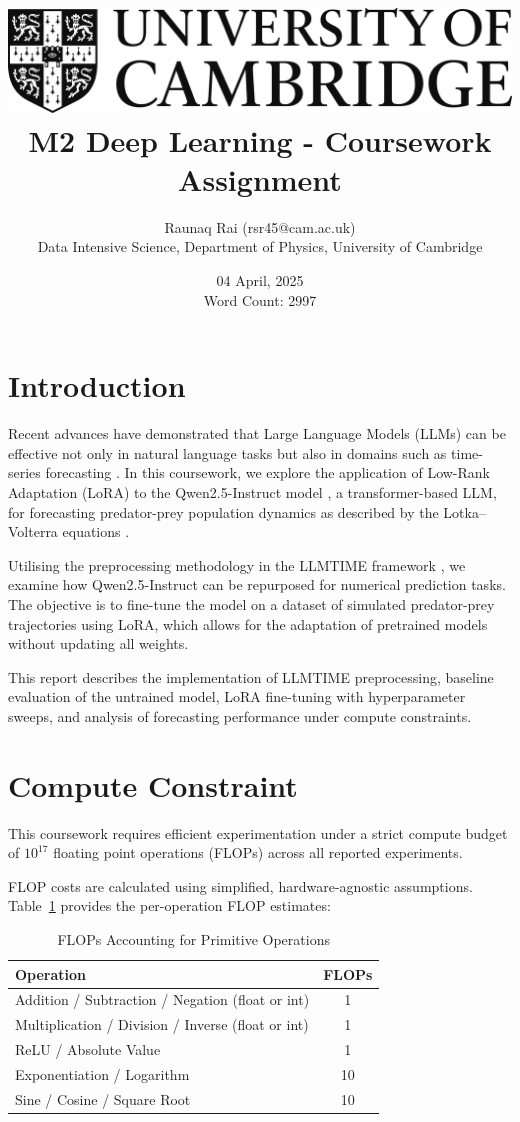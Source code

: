 \documentclass[a4paper,12pt]{article}
\title{
    \includegraphics[scale=0.4]{Cam_logo_bw.png}\\
    \vspace{0.5cm}
    M2 Deep Learning - Coursework Assignment
}
\author{Raunaq Rai (rsr45@cam.ac.uk)\\
    Data Intensive Science, Department of Physics, University of Cambridge
}
\date{04 April, 2025 \\ \vspace{0.2cm} {\small Word Count: 2997}}
\begin{document}
\maketitle

\section*{Introduction}

Recent advances have demonstrated that Large Language Models (LLMs) can be effective not only in natural language tasks but also in domains such as time-series forecasting \citep{gruver2023language}. In this coursework, we explore the application of Low-Rank Adaptation (LoRA) \citep{hu2021lora} to the Qwen2.5-Instruct model \citep{qwen2.5}, a transformer-based LLM, for forecasting predator-prey population dynamics as described by the Lotka–Volterra equations \citep{takeuchi2006lotka}.

Utilising the preprocessing methodology in the LLMTIME framework \citep{gruver2023language}, we examine how Qwen2.5-Instruct can be repurposed for numerical prediction tasks. The objective is to fine-tune the model on a dataset of simulated predator-prey trajectories using LoRA, which allows for the adaptation of pretrained models without updating all weights.

This report describes the implementation of LLMTIME preprocessing, baseline evaluation of the untrained model, LoRA fine-tuning with hyperparameter sweeps, and analysis of forecasting performance under compute constraints.

\section{Compute Constraint}

This coursework requires efficient experimentation under a strict compute budget of $10^{17}$ floating point operations (FLOPs) across all reported experiments.

FLOP costs are calculated using simplified, hardware-agnostic assumptions. Table~\ref{tab:flops_primitives} provides the per-operation FLOP estimates:

\begin{table}[H]
  \centering

  \begin{tabular}{lc}
    \hline
    Operation & FLOPs \\
    \hline
    Addition / Subtraction / Negation (float or int) & 1 \\
    Multiplication / Division / Inverse (float or int) & 1 \\
    ReLU / Absolute Value & 1 \\
    Exponentiation / Logarithm & 10 \\
    Sine / Cosine / Square Root & 10 \\
    \hline
  \end{tabular}
  \vspace{0.2cm}
  \caption{FLOPs Accounting for Primitive Operations}
  \label{tab:flops_primitives}
\end{table}
\end{document}

